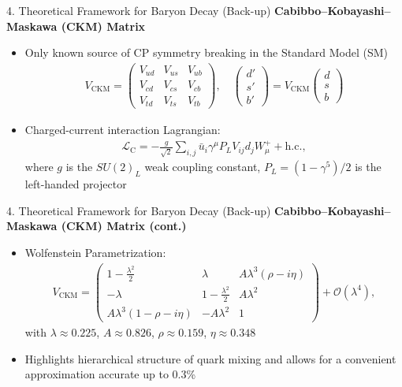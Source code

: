 \documentclass[xcolor=dvipsnames]{beamer}
\def\c{\gamma}
\def\l{\lambda}
\def\La{\mathcal{L}}
\def\bigO{\mathcal{O}}
\begin{document}
\begin{frame}{4. Theoretical Framework for Baryon Decay (Back-up)}
\textbf{Cabibbo–Kobayashi–Maskawa (CKM) Matrix}\\
\begin{itemize}
    \item Only known source of CP symmetry breaking in the Standard Model (SM)
    \begin{align*}
        V_{\mathrm {CKM}}=
        \begin{pmatrix}
            V_{ud} & V_{us} & V_{ub}\\
            V_{cd} & V_{cs} & V_{cb}\\
            V_{td} & V_{ts} & V_{tb}
        \end{pmatrix}, \quad
        \begin{pmatrix}
            d'\\
            s'\\
            b'
        \end{pmatrix}
        =V_{\mathrm{CKM}}
        \begin{pmatrix}
            d\\
            s\\
            b
        \end{pmatrix}
    \end{align*}
    \item Charged-current interaction Lagrangian:
    \begin{align*}
        \La_{\mathrm{C}}=-\frac{g}{\sqrt{2}}\sum_{i, j}\bar{u}_{i}\c^{\mu}P_{L}V_{ij}d_{j}W_{\mu}^{+}+\mathrm{h.c.},
    \end{align*}
    where $g$ is the $SU(2)_{L}$ weak coupling constant, $P_{L}=(1-\c^{5})/2$ is the left-handed projector
\end{itemize}
\end{frame}

\begin{frame}{4. Theoretical Framework for Baryon Decay (Back-up)}
\textbf{Cabibbo–Kobayashi–Maskawa (CKM) Matrix (cont.)}\\
\begin{itemize}
    \item Wolfenstein Parametrization:
    \begin{align*}
        V_{\mathrm{CKM}}=
        \begin{pmatrix}
            1-\frac{\l^2}{2} & \l & A\l^3 (\rho-i\eta)\\
            -\l & 1-\frac{\l^2}{2} & A\l^2\\
            A\l^3 (1-\rho-i\eta) & -A\l^2 & 1
        \end{pmatrix}
        +\bigO(\l^4),
    \end{align*}
    with $\l\approx0.225$, $A\approx0.826$, $\rho\approx0.159$, $\eta\approx0.348$
    \item Highlights hierarchical structure of quark mixing and allows for a convenient approximation accurate up to 0.3\%
\end{itemize}
\end{frame}
\end{document}
